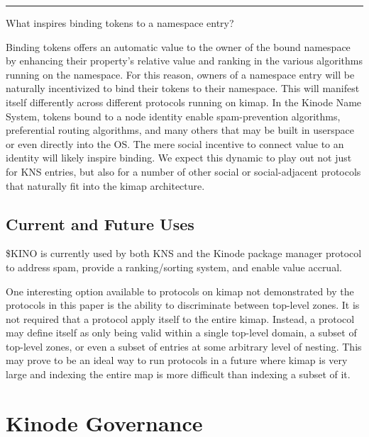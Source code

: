 \documentclass[runningheads]{llncs}
\begin{document}
\begin{center}
\noindent\rule{8cm}{0.4pt}
\end{center}

What inspires binding tokens to a namespace entry?

Binding tokens offers an automatic value to the owner of the bound namespace by enhancing their property's relative value and ranking in the various algorithms running on the namespace.
For this reason, owners of a namespace entry will be naturally incentivized to bind their tokens to their namespace.
This will manifest itself differently across different protocols running on kimap.
In the Kinode Name System, tokens bound to a node identity enable spam-prevention algorithms, preferential routing algorithms, and many others that may be built in userspace or even directly into the OS.
The mere social incentive to connect value to an identity will likely inspire binding.
We expect this dynamic to play out not just for KNS entries, but also for a number of other social or social-adjacent protocols that naturally fit into the kimap architecture.

\subsection{Current and Future Uses}
\label{sec:kinouses}

\$KINO is currently used by both KNS and the Kinode package manager protocol to address spam, provide a ranking/sorting system, and enable value accrual.

One interesting option available to protocols on kimap not demonstrated by the protocols in this paper is the ability to discriminate between top-level zones.
It is not required that a protocol apply itself to the entire kimap.
Instead, a protocol may define itself as only being valid within a single top-level domain, a subset of top-level zones, or even a subset of entries at some arbitrary level of nesting.
This may prove to be an ideal way to run protocols in a future where kimap is very large and indexing the entire map is more difficult than indexing a subset of it.

\section{Kinode Governance}
\label{sec:governance}
\end{document}
